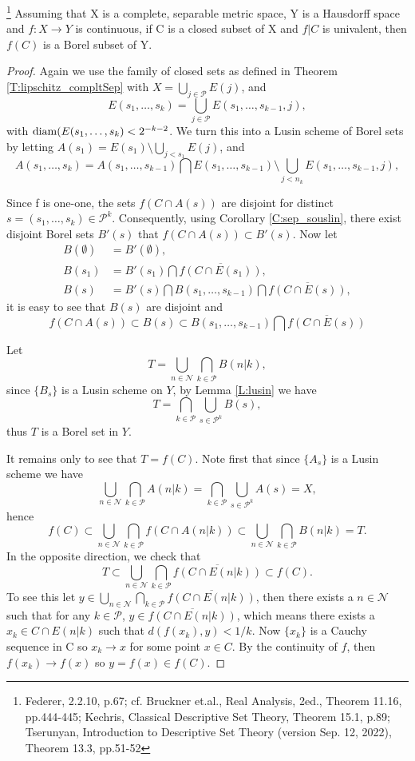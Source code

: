 \begin{lemma}
\footnote{Federer, 2.2.10, p.67;
  cf. Bruckner et.al., Real Analysis, 2ed., Theorem 11.16, pp.444-445; 
  Kechris, Classical Descriptive Set Theory, Theorem 15.1, p.89;
  Tserunyan, Introduction to Descriptive Set Theory (version Sep. 12, 2022), 
  Theorem 13.3, pp.51-52}
Assuming that X is a complete, separable metric space, Y is a Hausdorff space
and $f:X\to Y$ is continuous, if C is a closed subset of X and $f|C$ is 
univalent, then $f(C)$ is a Borel subset of Y.
\end{lemma}
\begin{proof}
Again we use the family of closed sets as defined in 
Theorem \ref{T:lipschitz_compltSep} with 
$X=\bigcup_{j\in\mathcal{P}} E(j)$, and
\[
	E(s_1,\dots,s_k)=\bigcup_{j\in\mathcal{P}} E(s_1,\dots,s_{k-1},j),
\]
with $\operatorname*{diam}(E(s_1,\dots,s_k)<2^{-k-2}$.
We turn this into a Lusin scheme of Borel sets by letting 
$A(s_1)=E(s_1)\setminus \bigcup_{j<s_1} E(j)$, and
\[
	A(s_1,\dots,s_k) = A(s_1,\dots,s_{k-1}) \bigcap E(s_1,\dots,s_{k-1})
	  \setminus \bigcup_{j<n_k} E(s_1,\dots,s_{k-1},j),
\]

Since f is one-one, the sets $f(C\cap A(s))$ are disjoint for distinct 
$s=(s_1,\dots,s_k)\in\mathcal{P}^k$. Consequently, using Corollary
\ref{C:sep_souslin}, there exist disjoint Borel sets $B'(s)$ that
$f(C\cap A(s))\subset B'(s)$. Now let
\begin{align*}
  B(\emptyset) &= B'(\emptyset), \\
  B(s_1) &= B'(s_1) \bigcap \overline{f(C\cap E(s_1))}, \\
  B(s) &= B'(s) \bigcap B(s_1,\dots,s_{k-1}) \bigcap \overline{f(C\cap E(s))},
\end{align*}
it is easy to see that $B(s)$ are disjoint and 
\[
  f(C\cap A(s))\subset B(s) \subset B(s_1,\dots,s_{k-1}) 
    \bigcap \overline{f(C\cap E(s))}
\]

Let 
\[
	T=\bigcup_{n\in\mathcal{N}} \bigcap_{k\in\mathcal{P}} B(n|k),
\]
since $\{B_s\}$ is a Lusin scheme on $Y$, by Lemma \ref{L:lusin} we have
\[
	T= \bigcap_{k\in\mathcal{P}} \bigcup_{s\in\mathcal{P}^k} B(s),
\]
thus $T$ is a Borel set in $Y$.

It remains only to see that $T=f(C)$. Note first that since $\{A_s\}$ is a 
Lusin scheme we have
\[
  \bigcup_{n\in\mathcal{N}} \bigcap_{k\in\mathcal{P}} A(n|k)
  = \bigcap_{k\in\mathcal{P}} \bigcup_{s\in\mathcal{P}^k} A(s)
  = X,
\]
hence
\[
  f(C)\subset 
    \bigcup_{n\in\mathcal{N}} \bigcap_{k\in\mathcal{P}} f(C\cap A(n|k)) 
	\subset \bigcup_{n\in\mathcal{N}} \bigcap_{k\in\mathcal{P}} B(n|k)
	= T.
\]
In the opposite direction, we check that
\[
  T\subset 
    \bigcup_{n\in\mathcal{N}} \bigcap_{k\in\mathcal{P}} 
	  \overline{ f(C\cap E(n|k)) }
	\subset f(C).
\]
To see this let 
$y\in\bigcup_{n\in\mathcal{N}} \bigcap_{k\in\mathcal{P}}
\overline{f(C\cap E(n|k))}$,
then there exists a $n\in\mathcal{N}$ such that for any $k\in\mathcal{P}$, 
$y\in\overline{f(C\cap E(n|k))}$, which means there exists a 
$x_k\in C\cap E(n|k)$ such that $d(f(x_k),y)<1/k$.
Now $\{x_k\}$ is a Cauchy sequence in C so $x_k\to x$ for some point $x\in C$.
By the continuity of $f$, then $f(x_k)\to f(x)$ so $y=f(x)\in f(C)$. 
\end{proof}

